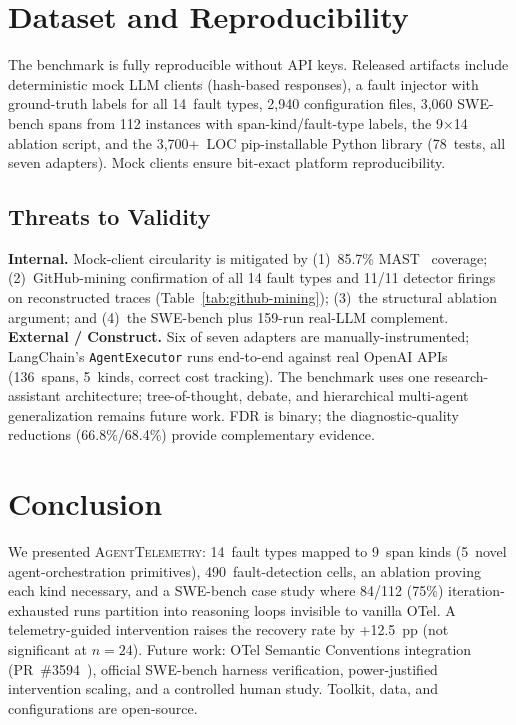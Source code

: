 \documentclass[sigconf,screen]{acmart}
\begin{document}
\section{Dataset and Reproducibility}
\label{sec:reproducibility}

The benchmark is fully reproducible without API keys.  Released
artifacts include deterministic mock LLM clients (hash-based responses),
a fault injector with ground-truth labels for all 14~fault types, 2{,}940
configuration files, 3{,}060 SWE-bench spans from 112 instances with
span-kind/fault-type labels, the 9$\times$14 ablation script, and the
3{,}700+~LOC pip-installable Python library (78~tests, all seven
adapters).  Mock clients ensure bit-exact platform reproducibility.

\subsection{Threats to Validity}

\textbf{Internal.} Mock-client circularity is mitigated by
(1)~85.7\% MAST~\cite{mast} coverage; (2)~GitHub-mining confirmation
of all 14 fault types and 11/11 detector firings on reconstructed
traces (Table~\ref{tab:github-mining}); (3)~the structural ablation
argument; and (4)~the SWE-bench plus 159-run real-LLM
complement.\quad
\textbf{External / Construct.} Six of seven adapters are
manually-instrumented; LangChain's \texttt{AgentExecutor} runs end-to-end
against real OpenAI APIs (136~spans, 5~kinds, correct cost tracking).
The benchmark uses one research-assistant architecture; tree-of-thought,
debate, and hierarchical multi-agent generalization remains future
work.  FDR is binary; the diagnostic-quality reductions
(66.8\%/68.4\%) provide complementary evidence.

\section{Conclusion}
\label{sec:conclusion}

We presented \textsc{AgentTelemetry}: 14~fault types mapped to 9~span
kinds (5~novel agent-orchestration primitives), 490~fault-detection
cells, an ablation proving each kind necessary, and a SWE-bench case
study where 84/112 (75\%) iteration-exhausted runs partition into
reasoning loops invisible to vanilla OTel.  A telemetry-guided
intervention raises the recovery rate by +12.5~pp (not significant at
$n{=}24$).  Future work: OTel Semantic Conventions integration
(PR~\#3594~\cite{otep_3594}), official SWE-bench harness verification,
power-justified intervention scaling, and a controlled human study.
Toolkit, data, and configurations are open-source.
\end{document}
